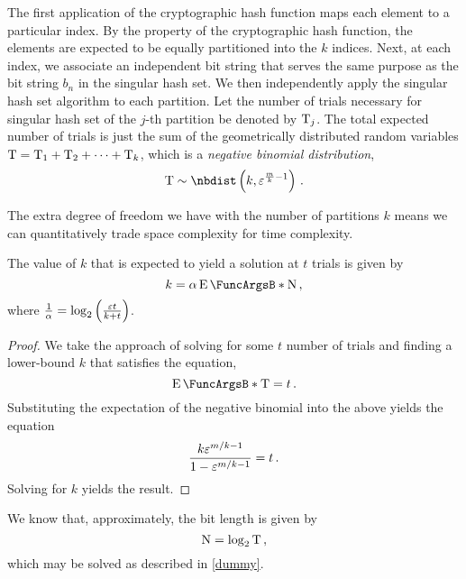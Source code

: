 \documentclass[ ../main.tex]{subfiles}
\begin{document}
The first application of the cryptographic hash function maps each element to a particular index.
By the property of the cryptographic hash function, the elements are expected to be equally partitioned into the $k$ indices.
Next, at each index, we associate an independent bit string that serves the same purpose as the bit string $b_n$ in the singular hash set.
We then independently apply the singular hash set algorithm to each partition.
Let the number of trials necessary for singular hash set of the $j$-th partition be denoted by $\mathrm{T}_j$.
The total expected number of trials is just the sum of the geometrically distributed random variables $\mathrm{T} = \mathrm{T}_1 + \mathrm{T}_2 + \cdots + \mathrm{T}_k$, which is a \emph{negative binomial distribution},
\begin{equation}
	\RV{T} \sim \nbdist\left(k, \fprate^{\frac{m}{k}-1}\right)\,.
\end{equation}

The extra degree of freedom we have with the number of partitions $k$ means we can quantitatively trade space complexity for time complexity.
\begin{theorem}
The value of $k$ that is expected to yield a solution at $t$ trials is given by
\begin{equation}
	k = \alpha \Expect{\RV{N}}\,,
\end{equation}
where $\frac{1}{\alpha} = \log_2 \left(\frac{\varepsilon t}{k + t}\right)$.
\end{theorem}
\begin{proof}
We take the approach of solving for some $t$ number of trials and finding a lower-bound $k$ that satisfies the equation,
\begin{equation}
	\Expect{\RV{T}} = t\,.
\end{equation}
Substituting the expectation of the negative binomial into the above yields the equation
\begin{equation}
	\frac{k \varepsilon^{m/k-1}}{1-\varepsilon^{m/k-1}} = t\,.
\end{equation}
Solving for $k$ yields the result.
\end{proof}

We know that, approximately, the bit length is given by
\begin{equation}
	\mathrm{N} = \log_2 \mathrm{T}\,,
\end{equation}
which may be solved as described in \cref{dummy}.
\end{document}
